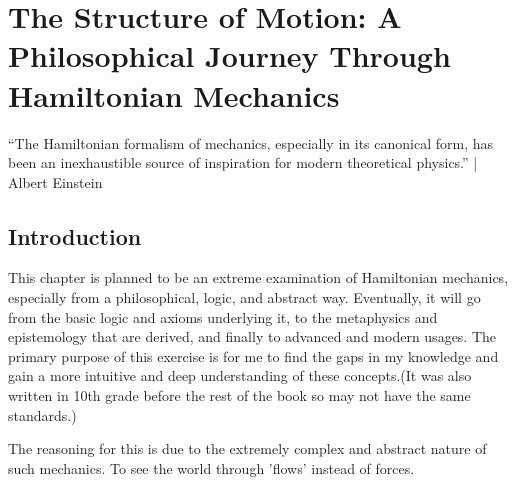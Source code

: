 \chapter{The Structure of Motion: A Philosophical Journey Through Hamiltonian Mechanics}
“The Hamiltonian formalism of mechanics, especially in its canonical form, has been an inexhaustible source of inspiration for modern theoretical physics.” | Albert Einstein
\section{Introduction}
\par This chapter is planned to be an extreme examination of Hamiltonian mechanics, especially from a philosophical, logic, and abstract way. Eventually, it will go from the basic logic and axioms underlying it, to the metaphysics and epistemology that are derived, and finally to advanced and modern usages. The primary purpose of this exercise is for me to find the gaps in my knowledge and gain a more intuitive and deep understanding of these concepts.(It was also written in 10th grade before the rest of the book so may not have the same standards.)
\par The reasoning for this is due to the extremely complex and abstract nature of such mechanics. To see the world through 'flows' instead of forces.
